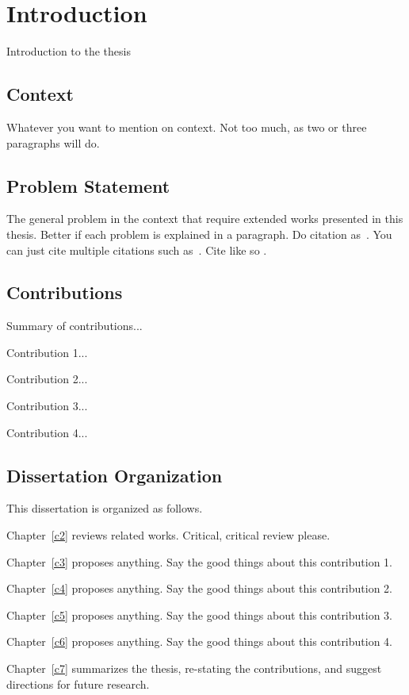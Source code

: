 \chapter{Introduction}\label{c1}%
Introduction to the thesis

\section{Context}
Whatever you want to mention on context. Not too much, as two or
three paragraphs will do.

\section{Problem Statement}
The general problem in the context that require extended works
presented in this thesis. Better if each problem is explained in a
paragraph. Do citation as~\cite{b1}. You can just cite multiple
citations such as~\cite{j1, c1, w1}. Cite like so \cite{b1}.

\section{Contributions}
Summary of contributions...

Contribution 1...

Contribution 2...

Contribution 3...

Contribution 4...

\section{Dissertation Organization}
This dissertation is organized as follows.

Chapter~\ref{c2} reviews related works. Critical, critical review
please.

Chapter~\ref{c3} proposes anything. Say the good things about this
contribution 1.

Chapter~\ref{c4} proposes anything. Say the good things about this
contribution 2.

Chapter~\ref{c5} proposes anything. Say the good things about this
contribution 3.

Chapter~\ref{c6} proposes anything. Say the good things about this
contribution 4.

Chapter~\ref{c7} summarizes the thesis, re-stating the
contributions, and suggest directions for future research.
